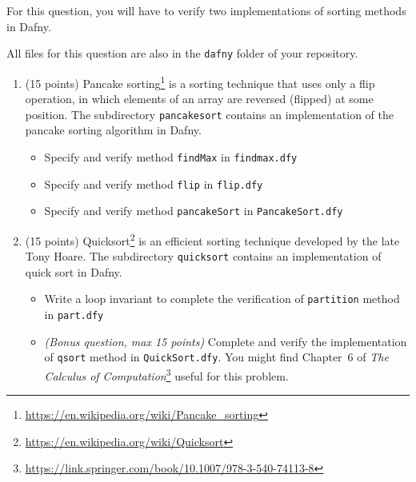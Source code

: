 For this question, you will have to verify two implementations of
sorting methods in Dafny. 

All files for this question are also in the \texttt{dafny} folder of
your repository.

\begin{enumerate}[label=(\alph*)]
\item (15 points) Pancake
  sorting\footnote{\url{https://en.wikipedia.org/wiki/Pancake_sorting}}
  is a sorting technique that uses only a flip operation, in which
  elements of an array are reversed (flipped) at some position. The
  subdirectory \texttt{pancakesort} contains an implementation of the pancake
  sorting algorithm in Dafny.
  \begin{itemize}
  \item Specify and verify method \texttt{findMax} in \texttt{findmax.dfy}
  \item Specify and verify method \texttt{flip} in \texttt{flip.dfy}
  \item Specify and verify method \texttt{pancakeSort} in \texttt{PancakeSort.dfy}
  \end{itemize}
  \item
    (15 points) Quicksort\footnote{\url{https://en.wikipedia.org/wiki/Quicksort}}
    is an efficient sorting technique developed by the late Tony Hoare. The
    subdirectory \texttt{quicksort} contains an implementation of quick
    sort in Dafny.
    \begin{itemize}
      \item Write a loop invariant to complete the verification of
        \texttt{partition} method in \texttt{part.dfy}
      \item \emph{(Bonus question, max 15 points)} Complete and verify the implementation of
        \texttt{qsort} method in \texttt{QuickSort.dfy}. You might
        find Chapter~6 of \emph{The Calculus of Computation}\footnote{\url{https://link.springer.com/book/10.1007/978-3-540-74113-8}} useful for this
        problem.
    \end{itemize}
\end{enumerate}
